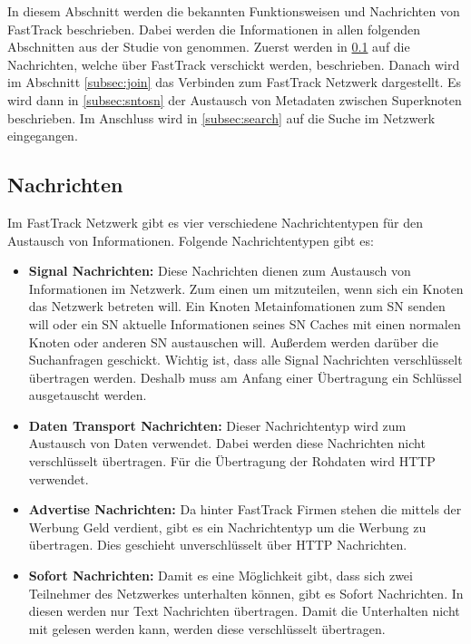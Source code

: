 In diesem Abschnitt werden die bekannten Funktionsweisen und Nachrichten von FastTrack beschrieben.
Dabei werden die Informationen in allen folgenden Abschnitten aus der Studie \cite{liang2006fasttrack} von genommen.
Zuerst werden in \ref{subsec:nachricht} auf die Nachrichten, welche über FastTrack verschickt werden, beschrieben.
Danach wird im Abschnitt \ref{subsec:join} das Verbinden zum FastTrack Netzwerk dargestellt.
Es wird dann in \ref{subsec:sntosn} der Austausch von Metadaten zwischen Superknoten beschrieben.
Im Anschluss wird in \ref{subsec:search} auf die Suche im Netzwerk eingegangen.

\subsection{Nachrichten}
\label{subsec:nachricht}

Im FastTrack Netzwerk gibt es vier verschiedene Nachrichtentypen für den Austausch von Informationen. Folgende Nachrichtentypen gibt es:

\begin{itemize}
\item[1.] \textbf{Signal Nachrichten:} Diese Nachrichten dienen zum Austausch von Informationen im Netzwerk.
Zum einen um mitzuteilen, wenn sich ein Knoten das Netzwerk betreten will.
Ein Knoten Metainfomationen zum SN senden will oder ein SN aktuelle Informationen seines SN Caches mit einen normalen Knoten oder anderen SN austauschen will.
Außerdem werden darüber die Suchanfragen geschickt.
Wichtig ist, dass alle Signal Nachrichten verschlüsselt übertragen werden.
Deshalb muss am Anfang einer Übertragung ein Schlüssel ausgetauscht werden.
\item[2.] \textbf{Daten Transport Nachrichten:} Dieser Nachrichtentyp wird zum Austausch von Daten verwendet. 
Dabei werden diese Nachrichten nicht verschlüsselt übertragen.
Für die Übertragung der Rohdaten wird HTTP verwendet.
\item[3.] \textbf{Advertise Nachrichten:} Da hinter FastTrack Firmen stehen die mittels der Werbung Geld verdient, gibt es ein Nachrichtentyp um die Werbung zu übertragen.
Dies geschieht unverschlüsselt über HTTP Nachrichten.
\item[4.] \textbf{Sofort Nachrichten:} Damit es eine Möglichkeit gibt, dass sich zwei Teilnehmer des Netzwerkes unterhalten können, gibt es Sofort Nachrichten.
In diesen werden nur Text Nachrichten übertragen.
Damit die Unterhalten nicht mit gelesen werden kann, werden diese verschlüsselt übertragen.
\end{itemize} 

